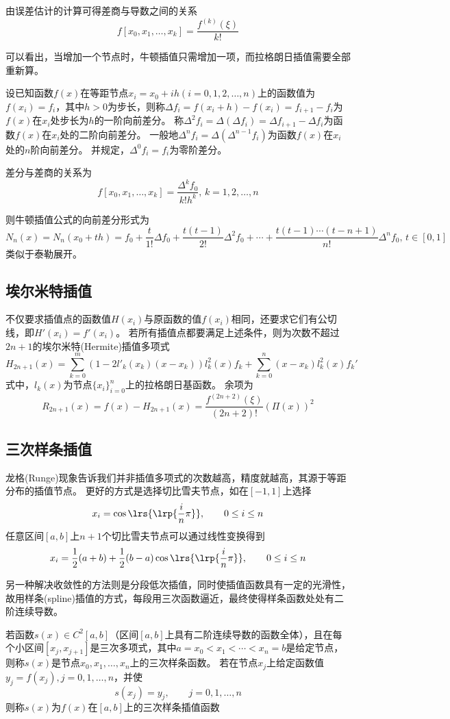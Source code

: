 由误差估计的计算可得差商与导数之间的关系
\[f[x_0,x_1,\ldots,x_k]=\frac{f^{(k)}(\xi)}{k!}\]

可以看出，当增加一个节点时，牛顿插值只需增加一项，而拉格朗日插值需要全部重新算。

\begin{definition}[差分]
设已知函数$f(x)$在等距节点$x_i=x_0+ih(i=0,1,2,\ldots,n)$上的函数值为$f(x_i)=f_i$，其中$h>0$为步长，则称$\Delta f_i=f(x_i+h)-f(x_i)=f_{i+1}-f_i$为$f(x)$在$x_i$处步长为$h$的一阶向前差分。
称$\Delta^2 f_i=\Delta(\Delta f_i)=\Delta f_{i+1}-\Delta f_i$为函数$f(x)$在$x_i$处的二阶向前差分。
一般地$\Delta^n f_i=\Delta(\Delta^{n-1} f_i)$为函数$f(x)$在$x_i$处的$n$阶向前差分。
并规定，$\Delta^0 f_i=f_i$为零阶差分。
\end{definition}
\par 差分与差商的关系为
\[f[x_0,x_1,\ldots,x_k]=\frac{\Delta^k f_0}{k!h^k},\,k=1,2,\ldots,n\]

则牛顿插值公式的向前差分形式为
\[N_n(x)=N_n(x_0+th)=f_0+\frac{t}{1!}\Delta f_0+\frac{t(t-1)}{2!}\Delta^2 f_0+\cdots+\frac{t(t-1)\cdots(t-n+1)}{n!}\Delta^n f_0,\,t\in[0,1]\]
类似于泰勒展开。

\subsection{埃尔米特插值}
不仅要求插值点的函数值$H(x_i)$与原函数的值$f(x_i)$相同，还要求它们有公切线，即$H'(x_i)=f'(x_i)$。
若所有插值点都要满足上述条件，则为次数不超过$2n+1$的埃尔米特(Hermite)插值多项式
\[H_{2n+1}(x)=\sum_{k=0}^m(1-2l'_k(x_k)(x-x_k))l_k^2(x)f_k+\sum_{k=0}^n(x-x_k)l_k^2(x)f_k'\]
式中，$l_k(x)$为节点$\{x_i\}_{i=0}^n$上的拉格朗日基函数。
余项为
\[R_{2n+1}(x)=f(x)-H_{2n+1}(x)=\frac{f^{(2n+2)}(\xi)}{(2n+2)!}(\Pi(x))^2\]

\subsection{三次样条插值}
龙格(Runge)现象告诉我们并非插值多项式的次数越高，精度就越高，其源于等距分布的插值节点。
更好的方式是选择切比雪夫节点，如在$[-1,1]$上选择
\[x_i=\cos\lrs{\lrp{\frac{i}{n}\pi}},\qquad 0\leq i\leq n\]
任意区间$[a,b]$上$n+1$个切比雪夫节点可以通过线性变换得到
\[x_i=\frac{1}{2}(a+b)+\frac{1}{2}(b-a)\cos\lrs{\lrp{\frac{i}{n}\pi}},\qquad 0\leq i\leq n\]

另一种解决收敛性的方法则是分段低次插值，同时使插值函数具有一定的光滑性，故用样条(spline)插值的方式，每段用三次函数逼近，最终使得样条函数处处有二阶连续导数。
\begin{definition}[三次样条函数]
    若函数$s(x)\in C^2[a,b]$（区间$[a,b]$上具有二阶连续导数的函数全体），且在每个小区间$[x_j,x_{j+1}]$是三次多项式，其中$a=x_0<x_1<\cdots<x_n=b$是给定节点，则称$s(x)$是节点$x_0,x_1,\ldots,x_n$上的三次样条函数。
    若在节点$x_j$上给定函数值$y_j=f(x_j),j=0,1,\ldots,n$，并使
    \[s(x_j)=y_j,\qquad j=0,1,\ldots,n\]
    则称$s(x)$为$f(x)$在$[a,b]$上的三次样条插值函数
\end{definition}

